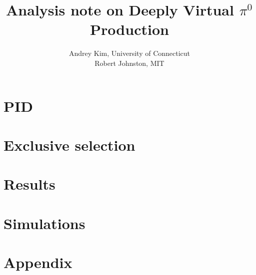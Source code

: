\documentclass[11pt]{report}
\title{Analysis note on Deeply Virtual $\pi^0$ Production}
\author{
Andrey Kim, University of Connecticut\\
Robert Johnston, MIT\\
}
\date{}
\begin{document}
\maketitle
\tableofcontents

\chapter{PID}


\chapter{Exclusive selection}


\chapter{Results}


\chapter{Simulations}


\chapter{Appendix}

\end{document}
